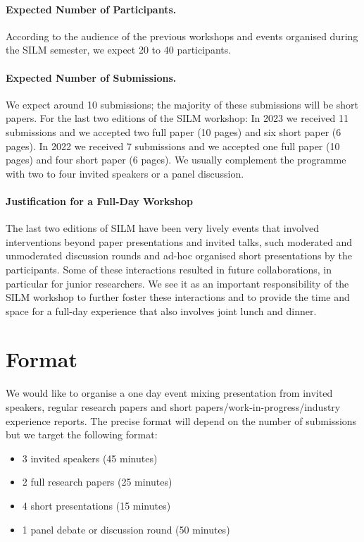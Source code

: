 \documentclass[a4paper,11pt]{article}
\begin{document}
\paragraph{Expected Number of Participants.}
%
According to the audience of the previous workshops and events organised
during the SILM semester, we expect 20 to 40 participants.

\paragraph{Expected Number of Submissions.}
%
We expect around 10 submissions; the majority of these submissions will be
short papers.
%
For the last two editions of the SILM workshop: 
In 2023 we received 11 submissions
and we accepted two full paper (10 pages) and six short paper (6 pages).
In 2022 we received 7 submissions
and we accepted one full paper (10 pages) and four short paper (6 pages).
We usually complement the programme with two to
four invited speakers or a panel discussion.

\paragraph{Justification for a Full-Day Workshop}
%
The last two editions of SILM have been very lively events that involved
interventions beyond paper presentations and invited talks, such moderated
and unmoderated discussion rounds and ad-hoc organised short presentations
by the participants. Some of these interactions resulted in future
collaborations, in particular for junior researchers. We see it as an
important responsibility of the SILM workshop to further foster these
interactions and to provide the time and space for a full-day experience
that also involves joint lunch and dinner.


\section{Format}
%
We would like to organise a one day event mixing presentation from invited
speakers, regular research papers and short
papers/work-in-progress/industry experience reports. The precise format
will depend on the number of submissions but we target the following
format:
%
\begin{itemize}
    \item 3 invited speakers (45 minutes)
    \item 2 full research papers (25 minutes)
    \item 4 short presentations (15 minutes)
    \item 1 panel debate or discussion round (50 minutes)
\end{itemize}
\end{document}

